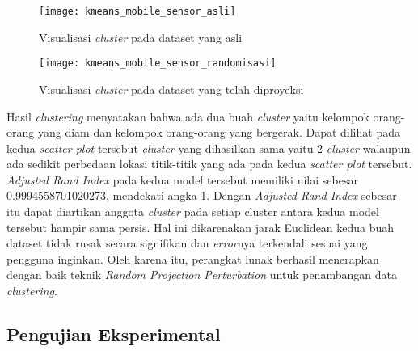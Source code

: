 \begin{figure}
	\centering
	\texttt{[image: kmeans\_mobile\_sensor\_asli]}
	\caption{Visualisasi \textit{cluster} pada dataset yang asli}
	\label{fig:kmeans_mobile_sensor_asli}
\end{figure}

\begin{figure}
	\centering
	\texttt{[image: kmeans\_mobile\_sensor\_randomisasi]}
	\caption{Visualisasi \textit{cluster} pada dataset yang telah diproyeksi}
	\label{fig:kmeans_mobile_sensor_randomisasi}
\end{figure}

Hasil \textit{clustering} menyatakan bahwa ada dua buah \textit{cluster} yaitu kelompok orang-orang yang diam dan kelompok orang-orang yang bergerak. Dapat dilihat pada kedua \textit{scatter plot} tersebut \textit{cluster} yang dihasilkan sama yaitu 2 \textit{cluster} walaupun ada sedikit perbedaan lokasi titik-titik yang ada pada kedua \textit{scatter plot} tersebut. \textit{Adjusted Rand Index} pada kedua model tersebut memiliki nilai sebesar 0.9994558701020273, mendekati angka 1. Dengan \textit{Adjusted Rand Index} sebesar itu dapat diartikan anggota \textit{cluster} pada setiap cluster antara kedua model tersebut hampir sama persis. Hal ini dikarenakan jarak Euclidean kedua buah dataset tidak rusak secara signifikan dan \textit{error}nya terkendali sesuai yang pengguna inginkan. Oleh karena itu, perangkat lunak berhasil menerapkan dengan baik teknik \textit{Random Projection Perturbation} untuk penambangan data \textit{clustering}.

\subsection{Pengujian Eksperimental}
\label{sec:pengujianeksperimental}